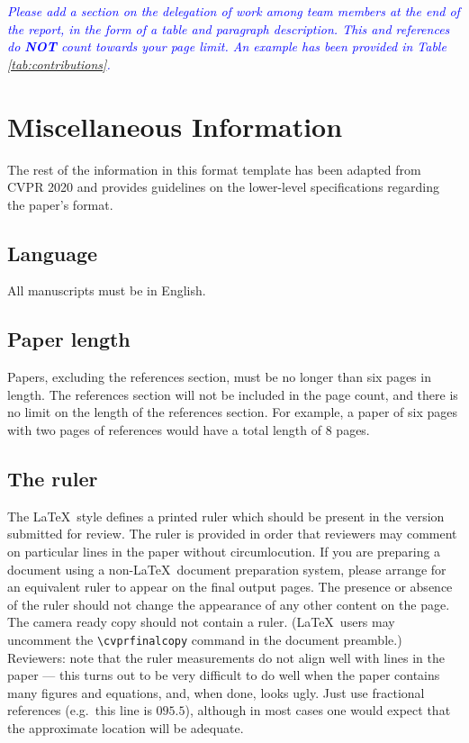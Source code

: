 \documentclass[10pt,twocolumn,letterpaper]{article}
\begin{document}
\textit{\textcolor{blue}{Please add a section on the delegation of work among team members at the end of the report, in the form of a table and paragraph description. This and references do \textbf{NOT} count towards your page limit. An example has been provided in Table \ref{tab:contributions}.}}

\newpage
\newpage
\section{Miscellaneous Information}

The rest of the information in this format template has been adapted from CVPR 2020 and provides guidelines on the lower-level specifications regarding the paper's format.

\subsection{Language}

All manuscripts must be in English.


\subsection{Paper length}
Papers, excluding the references section,
must be no longer than six pages in length. The references section
will not be included in the page count, and there is no limit on the
length of the references section. For example, a paper of six pages
with two pages of references would have a total length of 8 pages.

\subsection{The ruler}
The \LaTeX\ style defines a printed ruler which should be present in the
version submitted for review.  The ruler is provided in order that
reviewers may comment on particular lines in the paper without
circumlocution.  If you are preparing a document using a non-\LaTeX\
document preparation system, please arrange for an equivalent ruler to
appear on the final output pages.  The presence or absence of the ruler
should not change the appearance of any other content on the page.  The
camera ready copy should not contain a ruler. (\LaTeX\ users may uncomment
the \verb'\cvprfinalcopy' command in the document preamble.)  Reviewers:
note that the ruler measurements do not align well with lines in the paper
--- this turns out to be very difficult to do well when the paper contains
many figures and equations, and, when done, looks ugly.  Just use fractional
references (e.g.\ this line is $095.5$), although in most cases one would
expect that the approximate location will be adequate.
\end{document}
